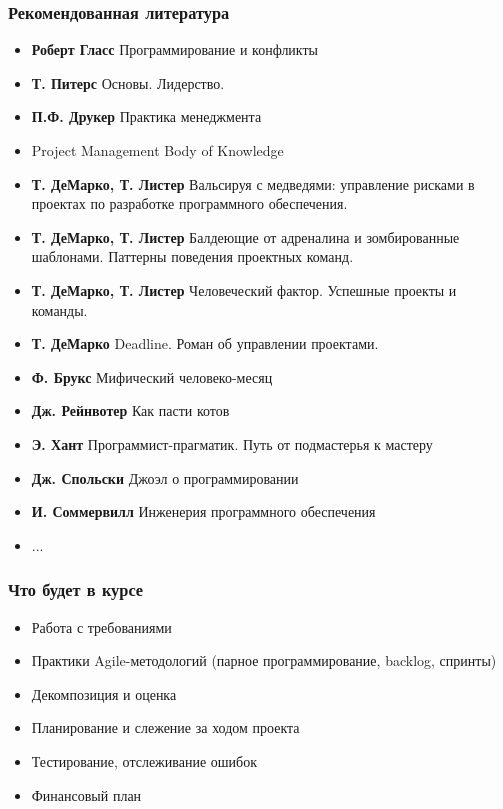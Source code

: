 \documentclass{../../slides-style}
\begin{document}
    \begin{frame}
        \frametitle{Рекомендованная литература}
        \begin{footnotesize}
            \begin{itemize}
                \item \textbf{Роберт Гласс} Программирование и конфликты
                \item \textbf{Т. Питерс} Основы. Лидерство.
                \item \textbf{П.Ф. Друкер} Практика менеджмента
                \item Project Management Body of Knowledge
                \item \textbf{Т. ДеМарко, Т. Листер} Вальсируя с медведями: управление рисками в проектах по разработке программного обеспечения.
                \item \textbf{Т. ДеМарко, Т. Листер} Балдеющие от адреналина и зомбированные шаблонами. Паттерны поведения проектных команд.
                \item \textbf{Т. ДеМарко, Т. Листер} Человеческий фактор. Успешные проекты и команды.
                \item \textbf{Т. ДеМарко} Deadline. Роман об управлении проектами.
                \item \textbf{Ф. Брукс} Мифический человеко-месяц
                \item \textbf{Дж. Рейнвотер} Как пасти котов
                \item \textbf{Э. Хант} Программист-прагматик. Путь от подмастерья к мастеру
                \item \textbf{Дж. Спольски} Джоэл о программировании
                \item \textbf{И. Соммервилл} Инженерия программного обеспечения
                \item ...
            \end{itemize}
        \end{footnotesize}
    \end{frame}

    \begin{frame}
        \frametitle{Что будет в курсе}
        \begin{footnotesize}
            \begin{itemize}
                \item Работа с требованиями
                \item Практики Agile-методологий (парное программирование, backlog, спринты)
                \item Декомпозиция и оценка
                \item Планирование и слежение за ходом проекта
                \item Тестирование, отслеживание ошибок
                \item Финансовый план
            \end{itemize}
        \end{footnotesize}
    \end{frame}
\end{document}
